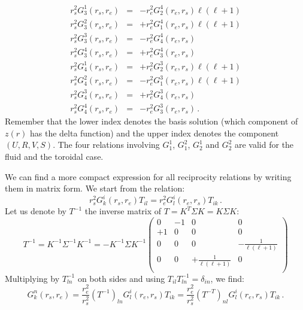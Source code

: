 \documentclass[11pt,a4paper]{article}
\begin{document}
\begin{eqnarray}
r_s^2 G_3^1(r_s,r_e) & = & -r_e^2 G_2^4(r_e,r_s)\ell(\ell+1) \nonumber \\
r_s^2 G_3^2(r_s,r_e) & = & +r_e^2 G_1^4(r_e,r_s)\ell(\ell+1) \nonumber \\
r_s^2 G_3^3(r_s,r_e) & = & -r_e^2 G_4^4(r_e,r_s) \nonumber \\
r_s^2 G_3^4(r_s,r_e) & = & +r_e^2 G_3^4(r_e,r_s)
\end{eqnarray}
\begin{eqnarray}
r_s^2 G_4^1(r_s,r_e) & = & +r_e^2 G_2^3(r_e,r_s)\ell(\ell+1) \nonumber \\
r_s^2 G_4^2(r_s,r_e) & = & -r_e^2 G_1^3(r_e,r_s)\ell(\ell+1) \nonumber \\
r_s^2 G_4^3(r_s,r_e) & = & +r_e^2 G_4^3(r_e,r_s) \nonumber \\
r_s^2 G_4^4(r_s,r_e) & = & -r_e^2 G_3^3(r_e,r_s) \,.
\end{eqnarray}
Remember that the lower index denotes the basis solution (which component of $z(r)$ has the delta function) and the upper index denotes the component $(U,R,V,S)$.
The four relations involving $G_1^1$, $G_1^2$, $G_2^1$ and $G_2^2$ are valid for the fluid and the toroidal case.

We can find a more compact expression for all reciprocity relations by writing them in matrix form. We start from the relation:
\begin{equation}
r_s^2 G_k^i(r_s,r_e) T_{il} = r_e^2 G_l^i(r_e,r_s) T_{ik} \,.
\end{equation}
Let us denote by $T^{-1}$ the inverse matrix of $T=K^T\Sigma K = K\Sigma K$:
\begin{equation}
T^{-1} = K^{-1}\Sigma^{-1} K^{-1} = -K^{-1}\Sigma K^{-1} 
\left(\begin{array}{cccc}
0 & -1 & 0 & 0 \\
+1 & 0 & 0 & 0 \\
0 & 0 & 0 & -\frac{1}{\ell(\ell+1)} \\
0 & 0 & +\frac{1}{\ell(\ell+1)} & 0 \\
\end{array}\right)
\end{equation}
Multiplying by $T^{-1}_{ln}$ on both sides and using $T_{il}T^{-1}_{ln}=\delta_{in}$, we find:
\begin{equation}
G_k^n(r_s,r_e) = \frac{r_e^2}{r_s^2} (T^{-1})_{ln} G_l^i(r_e,r_s) T_{ik} = \frac{r_e^2}{r_s^2} (T^{-T})_{nl} G_l^i(r_e,r_s) T_{ik}\,.
\end{equation}
%
\end{document}
